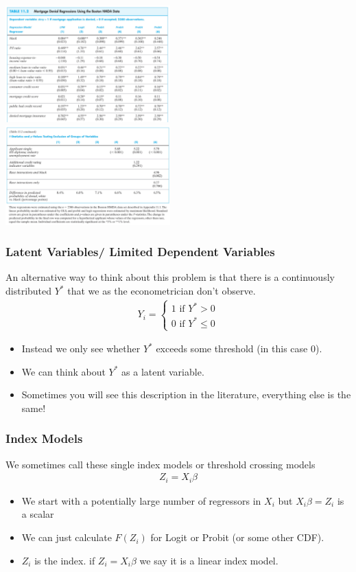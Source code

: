 \documentclass[aspectratio=169]{beamer}
\begin{document}
\begin{frame}
\begin{center}
\includegraphics[width=2.5in]{resources/hmda3.pdf}\\
\includegraphics[width=2.5in]{resources/hmda3a.pdf}\\
\end{center}
\end{frame}

\begin{frame}
\frametitle{Latent Variables/ Limited Dependent Variables}
An alternative way to think about this problem is that there is a continuously distributed $Y^{*}$ that we as the econometrician don't observe.
\begin{eqnarray*}
Y_i =
\begin{cases}
1 \mbox{ if } Y^{*} >0 \\
0 \mbox{ if } Y^{*} \leq 0
\end{cases}
\end{eqnarray*}
\begin{itemize}
\item Instead we only see whether $Y^{*}$ exceeds some threshold (in this case $0$).
\item We can think about $Y^{*}$ as a \alert{latent variable}.
\item Sometimes you will see this description in the literature, everything else is the same!
\end{itemize}
\end{frame}


\begin{frame}
\frametitle{Index Models}
We sometimes call these single index models or threshold crossing models
\begin{eqnarray*}
Z_i = X_i \beta
\end{eqnarray*}
\begin{itemize}
\item We start with a potentially large number of regressors in $X_i$ but $X_i \beta = Z_i$ is a \alert{scalar}
\item We can just calculate $F(Z_i)$ for Logit or Probit (or some other CDF).
\item $Z_i$ is the \alert{index}. if $Z_i = X_i \beta$ we say it is a \alert{linear index} model.
\end{itemize}
\end{frame}
\end{document}
